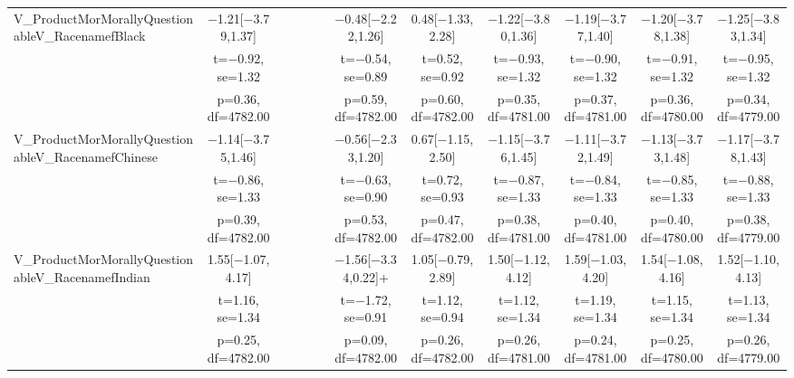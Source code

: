 \documentclass[]{report}
\begin{document}
\begin{table}
{\begin{tabular}[t]{lccccccccccc}
		V\_ProductMorMorallyQuestionableV\_RacenamefBlack & \num{-1.21}[\num{-3.79},\num{1.37}] &  &  &  &  & \num{-0.48}[\num{-2.22},\num{1.26}] & \num{0.48}[\num{-1.33},\num{2.28}] & \num{-1.22}[\num{-3.80},\num{1.36}] & \num{-1.19}[\num{-3.77},\num{1.40}] & \num{-1.20}[\num{-3.78},\num{1.38}] & \num{-1.25}[\num{-3.83},\num{1.34}]\\
		& t=\num{-0.92}, se=\num{1.32} &  &  &  &  & t=\num{-0.54}, se=\num{0.89} & t=\num{0.52}, se=\num{0.92} & t=\num{-0.93}, se=\num{1.32} & t=\num{-0.90}, se=\num{1.32} & t=\num{-0.91}, se=\num{1.32} & t=\num{-0.95}, se=\num{1.32}\\
		& p=\num{0.36}, df=\num{4782.00} &  &  &  &  & p=\num{0.59}, df=\num{4782.00} & p=\num{0.60}, df=\num{4782.00} & p=\num{0.35}, df=\num{4781.00} & p=\num{0.37}, df=\num{4781.00} & p=\num{0.36}, df=\num{4780.00} & p=\num{0.34}, df=\num{4779.00}\\
		V\_ProductMorMorallyQuestionableV\_RacenamefChinese & \num{-1.14}[\num{-3.75},\num{1.46}] &  &  &  &  & \num{-0.56}[\num{-2.33},\num{1.20}] & \num{0.67}[\num{-1.15},\num{2.50}] & \num{-1.15}[\num{-3.76},\num{1.45}] & \num{-1.11}[\num{-3.72},\num{1.49}] & \num{-1.13}[\num{-3.73},\num{1.48}] & \num{-1.17}[\num{-3.78},\num{1.43}]\\
		& t=\num{-0.86}, se=\num{1.33} &  &  &  &  & t=\num{-0.63}, se=\num{0.90} & t=\num{0.72}, se=\num{0.93} & t=\num{-0.87}, se=\num{1.33} & t=\num{-0.84}, se=\num{1.33} & t=\num{-0.85}, se=\num{1.33} & t=\num{-0.88}, se=\num{1.33}\\
		& p=\num{0.39}, df=\num{4782.00} &  &  &  &  & p=\num{0.53}, df=\num{4782.00} & p=\num{0.47}, df=\num{4782.00} & p=\num{0.38}, df=\num{4781.00} & p=\num{0.40}, df=\num{4781.00} & p=\num{0.40}, df=\num{4780.00} & p=\num{0.38}, df=\num{4779.00}\\
		V\_ProductMorMorallyQuestionableV\_RacenamefIndian & \num{1.55}[\num{-1.07},\num{4.17}] &  &  &  &  & \num{-1.56}[\num{-3.34},\num{0.22}]+ & \num{1.05}[\num{-0.79},\num{2.89}] & \num{1.50}[\num{-1.12},\num{4.12}] & \num{1.59}[\num{-1.03},\num{4.20}] & \num{1.54}[\num{-1.08},\num{4.16}] & \num{1.52}[\num{-1.10},\num{4.13}]\\
		& t=\num{1.16}, se=\num{1.34} &  &  &  &  & t=\num{-1.72}, se=\num{0.91} & t=\num{1.12}, se=\num{0.94} & t=\num{1.12}, se=\num{1.34} & t=\num{1.19}, se=\num{1.34} & t=\num{1.15}, se=\num{1.34} & t=\num{1.13}, se=\num{1.34}\\
		& p=\num{0.25}, df=\num{4782.00} &  &  &  &  & p=\num{0.09}, df=\num{4782.00} & p=\num{0.26}, df=\num{4782.00} & p=\num{0.26}, df=\num{4781.00} & p=\num{0.24}, df=\num{4781.00} & p=\num{0.25}, df=\num{4780.00} & p=\num{0.26}, df=\num{4779.00}\\

\end{tabular}}
\end{table}
\end{document}
